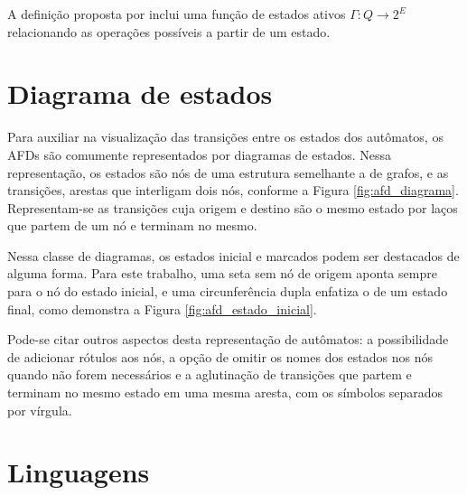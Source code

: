 A definição proposta por  inclui uma função de estados ativos $\Gamma : Q \rightarrow 2^E$ relacionando as operações possíveis a partir de um estado.

\section{Diagrama de estados}

Para auxiliar na visualização das transições entre os estados dos autômatos, os AFDs são comumente representados por diagramas de estados. Nessa representação, os estados são nós de uma estrutura semelhante a de grafos, e as transições, arestas que interligam dois nós, conforme a Figura \ref{fig:afd_diagrama}. Representam-se as transições cuja origem e destino são o mesmo estado por laços que partem de um nó e terminam no mesmo.


Nessa classe de diagramas, os estados inicial e marcados podem ser destacados de alguma forma. Para este trabalho, uma seta sem nó de origem aponta sempre para o nó do estado inicial, e uma circunferência dupla enfatiza o de um estado final, como demonstra a Figura \ref{fig:afd_estado_inicial}.


Pode-se citar outros aspectos desta representação de autômatos: a possibilidade de adicionar rótulos aos nós, a opção de omitir os nomes dos estados nos nós quando não forem necessários e a aglutinação de transições que partem e terminam no mesmo estado em uma mesma aresta, com os símbolos separados por vírgula.

\section{Linguagens}

